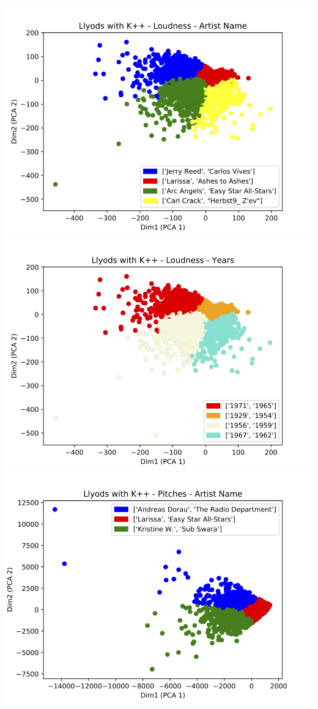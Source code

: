 \documentclass[11pt]{article}
\begin{document}
\begin{center}
\includegraphics[scale=0.3]{assests/fig5.png}
\includegraphics[scale=0.3]{assests/fig6.png}
\includegraphics[scale=0.3]{assests/fig7.png}

\end{center}
\end{document}
